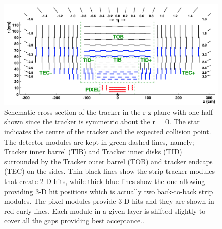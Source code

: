 \begin{figure}[ht]
	\centering
	\includegraphics[width=\textwidth]{MSc_Thesis/fig/innertracker.png}
	\vspace{2mm}
	\caption[Schematic cross section of the tracker in the r-z plane with one half shown since the tracker is symmetric about the r = 0. The star indicates the centre of the tracker and the expected collision point. The detector modules are kept in green dashed lines, namely; Tracker inner barrel (TIB) and Tracker inner disks (TID) surrounded by the Tracker outer barrel (TOB) and tracker endcaps (TEC) on the sides. Thin black lines show the strip tracker modules that create 2-D hits, while thick blue lines show the one allowing providing 3-D hit positions which is actually two back-to-back strip modules. The pixel modules provide 3-D hits and they are shown in red curly lines. Each module in a given layer is shifted slightly cover all the gaps providing best acceptance.]{Schematic cross section of the tracker in the r-z plane with one half shown since the tracker is symmetric about the r = 0. The star indicates the centre of the tracker and the expected collision point. The detector modules are kept in green dashed lines, namely; Tracker inner barrel (TIB) and Tracker inner disks (TID) surrounded by the Tracker outer barrel (TOB) and tracker endcaps (TEC) on the sides. Thin black lines show the strip tracker modules that create 2-D hits, while thick blue lines show the one allowing providing 3-D hit positions which is actually two back-to-back strip modules. The pixel modules provide 3-D hits and they are shown in red curly lines. Each module in a given layer is shifted slightly to cover all the gaps providing best acceptance.\cite{innertracker}.}
	\label{innertracker}
\end{figure}

